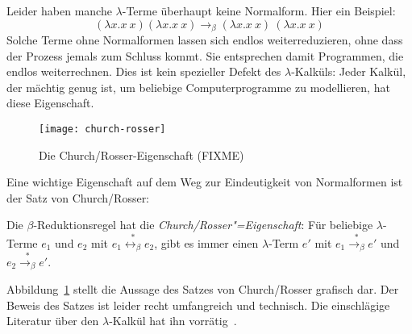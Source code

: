 Leider haben manche
$\lambda$-Terme überhaupt keine Normalform.  Hier ein
Beispiel:
%
\begin{displaymath}
  (\lambda x.x~x)(\lambda x.x~x) \rightarrow_\beta (\lambda x.x~x)~(\lambda x.x~x)
\end{displaymath}
%
Solche Terme ohne Normalformen lassen sich endlos weiterreduzieren,
ohne dass der Prozess jemals zum Schluss kommt.  Sie entsprechen damit
Programmen, die endlos weiterrechnen.
Dies ist kein spezieller Defekt des
$\lambda$-Kalküls: Jeder Kalkül, der mächtig genug ist, um beliebige
Computerprogramme zu modellieren, hat diese Eigenschaft.

\begin{figure}[tb]
  \begin{center}
    {
      \texttt{[image: church-rosser]}
      }
    \caption{Die Church/Rosser-Eigenschaft (FIXME)}
    \label{fig:church-rosser}
  \end{center}
\end{figure}

Eine wichtige Eigenschaft auf dem Weg zur Eindeutigkeit von
Normalformen ist der Satz von Church/Rosser:
%
\begin{satz}
  \label{satz:church-rosser}
  Die $\beta$-Reduktionsregel hat die 
  \textit{Church/Rosser"=Eigenschaft}:  Für
  beliebige $\lambda$-Terme $e_1$ und  $e_2$ mit
  $e_1 \overset{\ast}{\leftrightarrow_\beta} e_2$,
  gibt es immer einen $\lambda$-Term $e'$ mit
  $e_1\overset{\ast}{\rightarrow_\beta} e'$ und
  $e_2\overset{\ast}{\rightarrow_\beta} e'$.
\end{satz}
%
Abbildung~\ref{fig:church-rosser} stellt die Aussage des Satzes von
Church/Rosser grafisch dar.
Der Beweis des Satzes ist leider recht umfangreich und technisch.
Die einschlägige Literatur über den $\lambda$-Kalkül hat ihn
vorrätig~\cite{HindleySeldin1986}.

